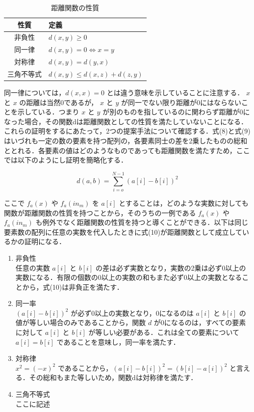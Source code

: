\begin{table}[H]
    \caption{距離関数の性質}
    \centering
    \begin{tabular}{cl}
        \hline
        性質  & 定義 \\
        \hline \hline
        非負性     & $ d(x, y) \geq 0 $ \\
        同一律     & $ d(x, y) = 0 \Leftrightarrow x = y $ \\
        対称律     & $ d(x, y) = d(y, x) $ \\
        三角不等式 & $ d(x, y) \leq d(x, z) + d(z, y) $ \\
        \hline
    \end{tabular}
\end{table}

同一律については，$ d(x, x) = 0 $ とは違う意味を示していることに注意する． $ x $ と $ x $ の距離は当然0であるが， $ x $ と $ y $ が同一でない限り距離が0にはならないことを示している．つまり $ x $ と $ y $ が別のものを指しているのに関わらず距離が0になった場合，その関数dは距離関数としての性質を満たしていないことになる．これらの証明をするにあたって，2つの提案手法について確認する．式(8)と式(9)はいづれも一定の数の要素を持つ配列の，各要素同士の差を2乗したものの総和ととれる．各要素の値はどのようなものであっても距離関数を満たすため，ここでは以下のようにし証明を簡略化する．

\begin{equation}
    d(a, b) = \sum_{i=o}^{N-1}(a[i] - b[i])^2
\end{equation}

ここで $ f_{a}(x) $ や $ f_{a}(in_{m}) $ を $ a[i] $ とすることは，どのような実数に対しても関数が距離関数の性質を持つことから，そのうちの一例である $ f_{a}(x) $ や $ f_{a}(in_{m}) $ も例外でなく距離関数の性質を持つと導くことができる．以下は同じ要素数の配列に任意の実数を代入したときに式(10)が距離関数として成立しているかの証明になる．

\begin{enumerate}
    \item 非負性 \\
    任意の実数 $ a[i] $ と $ b[i] $ の差は必ず実数となり，実数の2乗は必ず0以上の実数になる．有限の個数の0以上の実数の和もまた必ず0以上の実数となることから，式(10)は非負正を満たす．

    \item 同一率 \\
    $ (a[i] - b[i])^2 $ が必ず0以上の実数となり，0になるのは $ a[i] $ と $ b[i] $ の値が等しい場合のみであることから，関数 $ d $ が0になるのは，すべての要素に対して $ a[i] $ と $ b[i] $ が等しい必要がある．これは全ての要素について $ a[i] = b[i] $ であることを意味し，同一率を満たす．

    \item 対称律 \\
    $ x^2 = (-x)^2 $ であることから，$ (a[i] - b[i])^2 = (b[i] - a[i])^2 $ と言える．その総和もまた等しいため，関数dは対称律を満たす．

    \item 三角不等式 \\
    ここに記述
\end{enumerate}

